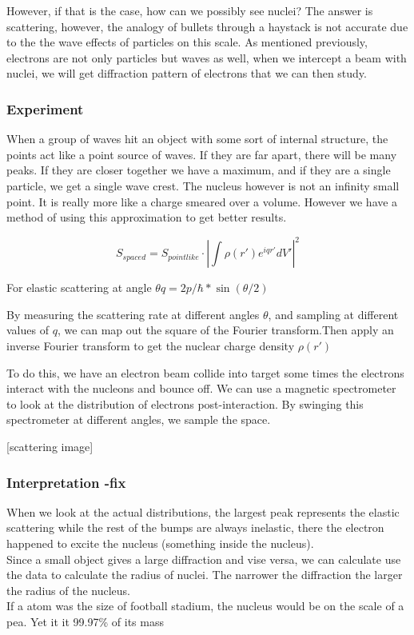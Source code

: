 \documentclass[english, 11pt]{article}
\begin{document}
However, if that is the case, how can we possibly see nuclei? The answer is scattering, however, the analogy of bullets through a haystack is not accurate due to the the wave effects of particles on this scale. As mentioned previously, electrons are not only particles but waves as well, when we intercept a beam with nuclei, we will get diffraction pattern of electrons that we can then study.

\subsubsection{Experiment}

When a group of waves hit an object with some sort of internal structure, the points act like a point source of waves. If they are far apart, there will be many peaks. If they are closer together we have a maximum, and if they are a single particle, we get a single wave crest. The nucleus however is not an infinity small point. It is really more like a charge smeared over a volume. However we have a method of using this approximation to get better results.

\[ S_{spaced} = S_{pointlike} \cdot |\int \rho(r') e^{iqr'}dV'| ^2 \]

For elastic scattering at angle $\theta q = 2p / \hbar * \sin(\theta/2)$

By measuring the scattering rate at different angles $\theta$, and sampling at different values of $q$, we can map out the square of the Fourier transform.Then apply an inverse Fourier transform to get the nuclear charge density $\rho(r')$

To do this, we have an electron beam collide into target some times the electrons interact with the nucleons and bounce off. We can use a magnetic spectrometer to look at the distribution of electrons post-interaction. By swinging this spectrometer at different angles, we sample the space. \\

\begin{center}
[scattering image]
\end{center}

\subsubsection{Interpretation -fix}

When we look at the actual distributions, the largest peak represents the elastic scattering while the rest of the bumps are always inelastic, there the electron happened to excite the nucleus (something inside the nucleus).\\
Since a small object gives a large diffraction and vise versa, we can calculate use the data to calculate the radius of nuclei. The narrower the diffraction the larger the radius of the nucleus.\\
If a atom was the size of football stadium, the nucleus would be on the scale of a pea. Yet it it 99.97\% of its mass
\end{document}

